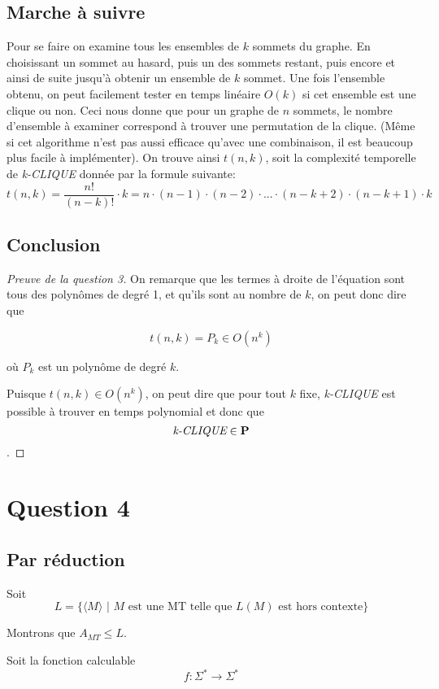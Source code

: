 \documentclass{article}
\newcommand\PP{{\normalfont{\textbf{P}}}}
\newcommand\bk[1]{\langle #1 \rangle}
\newcommand\cli[1]{\textit{#1-CLIQUE}}
\begin{document}
\subsection{Marche à suivre}
Pour se faire on examine tous les ensembles de $k$ sommets du graphe. En choisissant un sommet au hasard, puis un des sommets restant, puis encore et ainsi de suite jusqu'à obtenir un ensemble de $k$ sommet. Une fois l'ensemble obtenu, on peut facilement tester en temps linéaire $O(k)$ si cet ensemble est une clique ou non. Ceci nous donne que pour un graphe de $n$ sommets, le nombre d'ensemble à examiner correspond à trouver une permutation de la clique. (Même si cet algorithme n'est pas aussi efficace qu'avec une combinaison, il est beaucoup plus facile à implémenter). On trouve ainsi $t(n,k)$, soit la complexité temporelle de \cli{k} donnée par la formule suivante:
$$ t(n, k) = \frac{n!}{(n-k)!} \cdot k= n \cdot (n - 1) \cdot (n - 2) \cdot ... \cdot (n - k + 2) \cdot (n - k + 1) \cdot k$$

\subsection{Conclusion}
\begin{proof}[Preuve de la question 3]
  On remarque que les termes à droite de l'équation sont tous des polynômes de degré 1, et qu'ils sont au nombre de $k$, on peut donc dire que

$$ t(n, k) = P_k \in O(n^k) $$

  où $P_k$ est un polynôme de degré $k$.
  
  Puisque $t(n,k) \in O(n^k)$, on peut dire que pour tout $k$ fixe, \cli{k} est possible à trouver en temps polynomial et donc que $$\cli{k} \in \PP$$.
\end{proof}

\pagebreak

\section{Question 4}
\subsection{Par réduction}
Soit
$$ L= \{\bk{M} \text{ | $M$ est une MT telle que $L(M)$ est hors contexte}\} $$

Montrons que $A_{MT} \leq L$.

Soit la fonction calculable
$$f : \Sigma^* \rightarrow \Sigma^*$$
\end{document}
